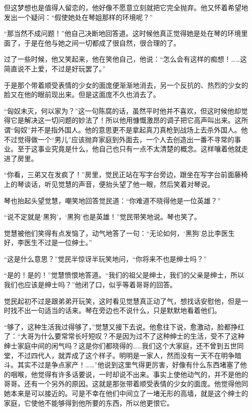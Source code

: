 \par 但这梦想也是值得人留恋的，他好像不愿意立刻就把它完全抛弃。他又怀着希望地发出一个疑问：“假使她处在琴姐那样的环境呢？”
\par “那当然不成问题！”他自己决断地回答道。这时候他真正觉得她是处在琴的环境里面了，于是在他与她之间一切都成了很自然，很合理的了。
\par 过了一些时候，他又笑起来，他在笑他自己，他说：“怎么会有这样的痴想！……这简直说不上爱，不过是好玩罢了。”
\par 于是那个带着顺受表情的少女的面庞便渐渐地消去，另一个反抗的、热烈的少女的脸又在他的眼前现出来。但是这面庞不久也消去了。
\par “匈奴未灭，何以家为？”这一句陈腐的话，虽然平时他并不喜欢，但这时候他却觉得它是解决这一切问题的妙法了！所以他用慷慨激昂的调子把它高声叫出来。这所谓“匈奴”并不是指外国人。他的意思更不是拿起真刀真枪到战场上去杀外国人。他不过觉得做一个“男儿”应该抛弃家庭到外面去，一个人去创造出一番不寻常的事业。至于这事业究竟是什么，他自己也只有一点不太清楚的概念。这样嚷着他就走进了房里。
\par “你看，三弟又在发疯了！”房里，觉民正站在写字台旁边，跟坐在写字台前面藤椅上的琴谈话，听见觉慧的声音，便抬头望了他一眼，然后笑着对琴说。
\par 琴也抬起头望觉慧，嘲笑地回答觉民道：“你难道不晓得他是一位英雄？”
\par “说不定就是‘黑狗’，‘黑狗’也是英雄！”觉民带笑地说。琴也笑了。
\par 觉慧被他们笑得有点发恼了，动气地答了一句：“无论如何，‘黑狗’总比李医生好，李医生不过是一位绅士。”
\par “这是什么意思？”觉民半惊讶半玩笑地问，“你将来不也是绅士吗？”
\par “是的！是的！”觉慧愤恨地答道。“我们的祖父是绅士，我们的父亲是绅士，所以我们也应该是绅士吗？”他闭了口，似乎等着哥哥的回答。
\par 觉民起初不过是跟弟弟开玩笑，这时看见觉慧真正动了气，想找话安慰他，但是一时找不出一句适当的话来。琴在旁边也不说什么，只是默默地看着他们。
\par “够了，这种生活我过得够了，”觉慧又接下去说。他愈往下说，愈激动，脸都挣红了：“大哥为什么要常常长吁短叹？不是因为过不了这种绅士的生活，受不了这种绅士家庭中间的闲气吗？这是你们都晓得的……我们这个大家庭，还不曾到五世同堂，不过四代人，就弄成了这个样子。明明是一家人，然而没有一天不在明争暗斗。其实不过是争点家产！……”他说到这里气得更厉害，好像有什么东西堵塞了他的咽喉，他觉得有许多话要说，一时却说不出来。事实上使他动气的，并不是他的哥哥。还有一个另外的原因。这就是那张带着顺受表情的少女的面庞。他觉得他同她本来是可以接近的。可是不幸在他们中间立了一堵无形的高墙，就是这个绅士的家庭，它使他不能够得到他所要的东西，所以他更恨它。
